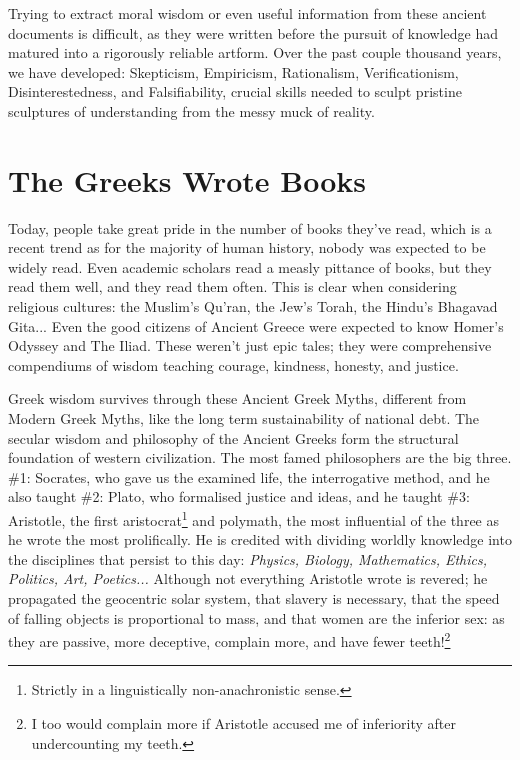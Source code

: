Trying to extract moral wisdom or even useful information from these ancient documents is difficult, as they were written before the pursuit of knowledge had matured into a rigorously reliable artform. Over the past couple thousand years, we have developed: Skepticism, Empiricism, Rationalism, Verificationism, Disinterestedness, and Falsifiability, crucial skills needed to sculpt pristine sculptures of understanding from the messy muck of reality.

\section{The Greeks Wrote Books}

Today, people take great pride in the number of books they've read, which is a recent trend as for the majority of human history, nobody was expected to be widely read. Even academic scholars read a measly pittance of books, but they read them well, and they read them often. This is clear when considering religious cultures: the Muslim's Qu'ran, the Jew's Torah, the Hindu's Bhagavad Gita... Even the good citizens of Ancient Greece were expected to know Homer's Odyssey and The Iliad. These weren't just epic tales; they were comprehensive compendiums of wisdom teaching courage, kindness, honesty, and justice. 

Greek wisdom survives through these Ancient Greek Myths, different from Modern Greek Myths, like the long term sustainability of national debt. The secular wisdom and philosophy of the Ancient Greeks form the structural foundation of western civilization. The most famed philosophers are the big three. \#1: Socrates, who gave us the examined life, the interrogative method, and he also taught \#2: Plato, who formalised justice and ideas, and he taught \#3: Aristotle, the first aristocrat\footnote{Strictly in a linguistically non-anachronistic sense.} and polymath, the most influential of the three as he wrote the most prolifically. He is credited with dividing worldly knowledge into the disciplines that persist to this day: \textit{Physics, Biology, Mathematics, Ethics, Politics, Art, Poetics...} Although not everything Aristotle wrote is revered; he propagated the geocentric solar system, that slavery is necessary, that the speed of falling objects is proportional to mass, and that women are the inferior sex: as they are passive, more deceptive, complain more, and have fewer teeth!\footnote{I too would complain more if Aristotle accused me of inferiority after undercounting my teeth.}

